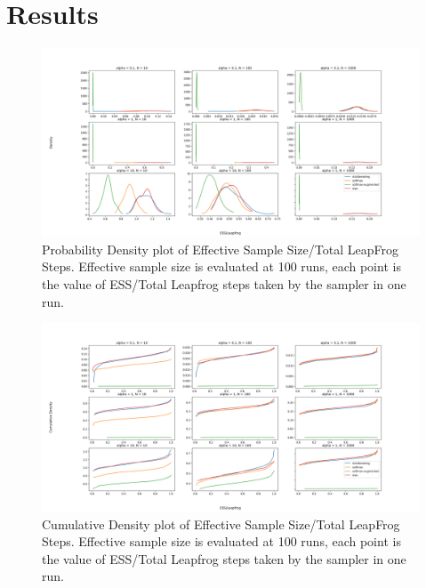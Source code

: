 \documentclass[11pt]{article}
\begin{document}
\section{Results}
\begin{figure}[h!]
    \centering
    \includegraphics[width=1.2\textwidth]{figures/simplex/ess_density.png}
    \caption{Probability Density plot of Effective Sample Size/Total LeapFrog Steps. Effective sample size is evaluated at 100 runs, each point is the value of ESS/Total Leapfrog steps taken by the sampler in one run.}
    \label{fig:ess_density}
\end{figure}
\newpage
\begin{figure}[h!]
    \centering
    \includegraphics[width=1.2\textwidth]{figures/simplex/ess_cdf.png}
    \caption{Cumulative Density plot of Effective Sample Size/Total LeapFrog Steps. Effective sample size is evaluated at 100 runs, each point is the value of ESS/Total Leapfrog steps taken by the sampler in one run.}
    \label{fig:ess_cdf}
\end{figure}
\end{document}
